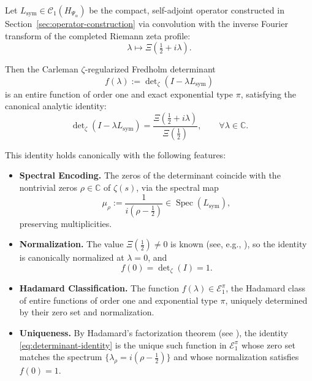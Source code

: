 \begin{theorem}
\label{thm:det-identity-revised}
\leavevmode
\begin{tcolorbox}[colback=gray!3!white,colframe=black!75!white,title={\textbf{Canonical Determinant Identity}}]
Let \( L_{\mathrm{sym}} \in \mathcal{C}_1(H_{\Psi_\alpha}) \) be the compact, self-adjoint operator constructed in Section~\ref{sec:operator-construction} via convolution with the inverse Fourier transform of the completed Riemann zeta profile:
\[
\lambda \mapsto \Xi\left(\tfrac{1}{2} + i\lambda\right).
\]

\medskip

Then the Carleman \(\zeta\)-regularized Fredholm determinant
\[
f(\lambda) := \det\nolimits_\zeta(I - \lambda L_{\mathrm{sym}})
\]
is an entire function of order one and exact exponential type \( \pi \), satisfying the canonical analytic identity:
\begin{equation}
\det\nolimits_\zeta(I - \lambda L_{\mathrm{sym}})
= \frac{\Xi\left(\tfrac{1}{2} + i\lambda\right)}{\Xi\left(\tfrac{1}{2}\right)},
\qquad \forall \lambda \in \mathbb{C}.
\label{eq:determinant-identity}
\end{equation}

\medskip

This identity holds canonically with the following features:
\begin{itemize}
  \item \textbf{Spectral Encoding.} The zeros of the determinant coincide with the nontrivial zeros \( \rho \in \mathbb{C} \) of \( \zeta(s) \), via the spectral map
  \[
  \mu_\rho := \frac{1}{i(\rho - \tfrac{1}{2})} \in \operatorname{Spec}(L_{\mathrm{sym}}),
  \]
  preserving multiplicities.

  \item \textbf{Normalization.} The value \( \Xi(\tfrac{1}{2}) \ne 0 \) is known (see, e.g., \cite[Thm.~2.3]{Titchmarsh1986Zeta}), so the identity is canonically normalized at \( \lambda = 0 \), and
  \[
  f(0) = \det\nolimits_\zeta(I) = 1.
  \]

  \item \textbf{Hadamard Classification.} The function \( f(\lambda) \in \mathcal{E}_1^\pi \), the Hadamard class of entire functions of order one and exponential type \( \pi \), uniquely determined by their zero set and normalization.

  \item \textbf{Uniqueness.} By Hadamard’s factorization theorem (see \cite[Ch.~3]{Levin1996EntireLectures}), the identity \eqref{eq:determinant-identity} is the unique such function in \( \mathcal{E}_1^\pi \) whose zero set matches the spectrum \( \{ \lambda_\rho = i(\rho - \tfrac{1}{2}) \} \) and whose normalization satisfies \( f(0) = 1 \).
\end{itemize}
\end{tcolorbox}
\end{theorem}
